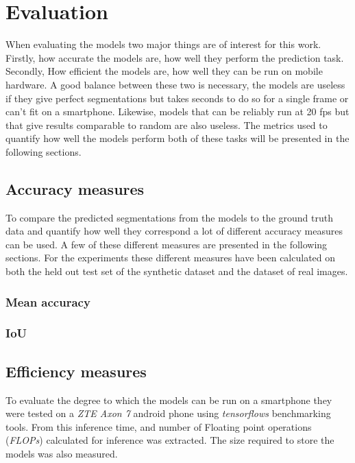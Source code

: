 \documentclass{kththesis}
\begin{document}
\section{Evaluation}
When evaluating the models two major things are of interest for this work.
Firstly, how accurate the models are, how well they perform the prediction task.
Secondly, How efficient the models are, how well they can be run on mobile
hardware. A good balance between these two is necessary, the models are useless
if they give perfect segmentations but takes seconds to do so for a single frame
or can't fit on a smartphone. Likewise, models that can be reliably run at 20
fps but that give results comparable to random are also useless. The metrics
used to quantify how well the models perform both of these tasks will be
presented in the following sections.

\subsection{Accuracy measures}
To compare the predicted segmentations from the models to the ground truth data
and quantify how well they correspond a lot of different accuracy measures can
be used. A few of these different measures are presented in the following
sections. For the experiments these different measures have been calculated on
both the held out test set of the synthetic dataset and the dataset of real
images.

\subsubsection{Mean accuracy}

\subsubsection{IoU}

\subsection{Efficiency measures}
To evaluate the degree to which the models can be run on a smartphone they were
tested on a \textit{ZTE Axon 7} android phone using \textit{tensorflows}
benchmarking tools. From this inference time, and number of Floating point
operations (\textit{FLOPs}) calculated for inference was extracted. The size
required to store the models was also measured. 
\end{document}
